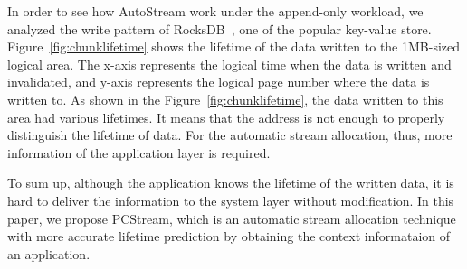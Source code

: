 In order to see how AutoStream work under the append-only workload,
we analyzed the write pattern of RocksDB~\cite{RocksDB}, one of the popular key-value store.
Figure~\ref{fig:chunklifetime} shows the lifetime of the data written to the 1MB-sized logical area.
The x-axis represents the logical time when the data is written and invalidated, and y-axis
represents the logical page number where the data is written to.
As shown in the Figure~\ref{fig:chunklifetime}, the data written to this area had various lifetimes.
It means that the address is not enough to properly distinguish the lifetime of data.
For the automatic stream allocation, thus, more information of the application layer is required.


To sum up, although the application knows the lifetime of the written data, it is hard to 
deliver the information to the system layer without modification.
In this paper, we propose PCStream, which is an automatic stream allocation technique with
more accurate lifetime prediction by obtaining the context informataion of an application.


